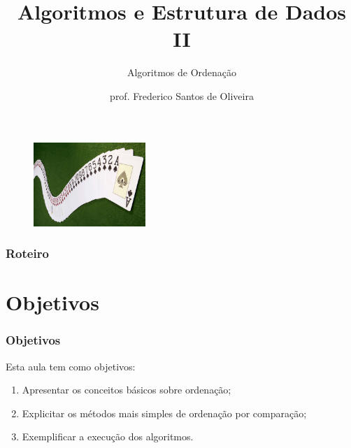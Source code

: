 \documentclass[aspectratio=169]{beamer}
\title[Algoritmos de Ordenação]{Algoritmos e Estrutura de Dados II}
\subtitle{Algoritmos de Ordenação}
\author[Frederico Santos de Oliveira]{prof. Frederico Santos de Oliveira}
\institute[UFMT]{Universidade Federal de Mato Grosso\\ Instituto de Engenharia}
\date{}
\begin{document}

\begin{frame}
\titlepage %

\begin{figure}[!h]
  \centering
  \includegraphics[width=120pt]{imgs/introducao.jpg}
  \label{fig_introducao}
\end{figure}
\end{frame}


\begin{frame}
\frametitle{Roteiro} %
\tableofcontents %
\end{frame}


\section{Objetivos}

\begin{frame}
\frametitle{Objetivos}

Esta aula tem como objetivos:

\begin{enumerate}
\item Apresentar os conceitos básicos sobre ordenação;
\item Explicitar os métodos mais simples de ordenação por comparação;
\item Exemplificar a execução dos algoritmos.
\end{enumerate}
\end{frame}
\end{document}
